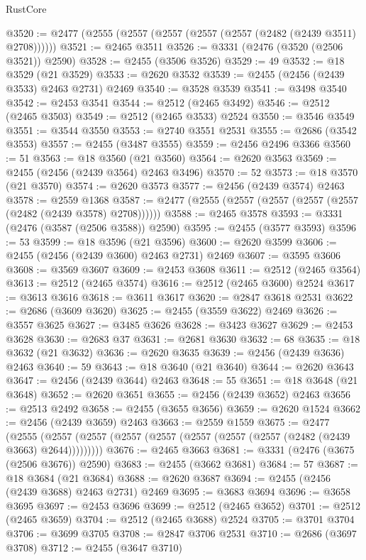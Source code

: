 \begin{lexlean}{RustCore}
\begin{coremodule}
@3520 := @2477 (@2555 (@2557 (@2557 (@2557 (@2557 (@2482 (@2439 @3511) @2708))))))
@3521 := @2465 @3511
@3526 := @3331 (@2476 (@3520 (@2506 @3521)) @2590)
@3528 := @2455 (@3506 @3526)
@3529 := 49
@3532 := @18 @3529 (@21 @3529)
@3533 := @2620 @3532
@3539 := @2455 (@2456 (@2439 @3533) @2463 @2731) @2469
@3540 := @3528 @3539
@3541 := @3498 @3540
@3542 := @2453 @3541
@3544 := @2512 (@2465 @3492)
@3546 := @2512 (@2465 @3503)
@3549 := @2512 (@2465 @3533) @2524
@3550 := @3546 @3549
@3551 := @3544 @3550
@3553 := @2740 @3551 @2531
@3555 := @2686 (@3542 @3553)
@3557 := @2455 (@3487 @3555)
@3559 := @2456 @2496 @3366
@3560 := 51
@3563 := @18 @3560 (@21 @3560)
@3564 := @2620 @3563
@3569 := @2455 (@2456 (@2439 @3564) @2463 @3496)
@3570 := 52
@3573 := @18 @3570 (@21 @3570)
@3574 := @2620 @3573
@3577 := @2456 (@2439 @3574) @2463
@3578 := @2559 @1368
@3587 := @2477 (@2555 (@2557 (@2557 (@2557 (@2557 (@2482 (@2439 @3578) @2708))))))
@3588 := @2465 @3578
@3593 := @3331 (@2476 (@3587 (@2506 @3588)) @2590)
@3595 := @2455 (@3577 @3593)
@3596 := 53
@3599 := @18 @3596 (@21 @3596)
@3600 := @2620 @3599
@3606 := @2455 (@2456 (@2439 @3600) @2463 @2731) @2469
@3607 := @3595 @3606
@3608 := @3569 @3607
@3609 := @2453 @3608
@3611 := @2512 (@2465 @3564)
@3613 := @2512 (@2465 @3574)
@3616 := @2512 (@2465 @3600) @2524
@3617 := @3613 @3616
@3618 := @3611 @3617
@3620 := @2847 @3618 @2531
@3622 := @2686 (@3609 @3620)
@3625 := @2455 (@3559 @3622) @2469
@3626 := @3557 @3625
@3627 := @3485 @3626
@3628 := @3423 @3627
@3629 := @2453 @3628
@3630 := @2683 @37
@3631 := @2681 @3630
@3632 := 68
@3635 := @18 @3632 (@21 @3632)
@3636 := @2620 @3635
@3639 := @2456 (@2439 @3636) @2463
@3640 := 59
@3643 := @18 @3640 (@21 @3640)
@3644 := @2620 @3643
@3647 := @2456 (@2439 @3644) @2463
@3648 := 55
@3651 := @18 @3648 (@21 @3648)
@3652 := @2620 @3651
@3655 := @2456 (@2439 @3652) @2463
@3656 := @2513 @2492
@3658 := @2455 (@3655 @3656)
@3659 := @2620 @1524
@3662 := @2456 (@2439 @3659) @2463
@3663 := @2559 @1559
@3675 := @2477
    (@2555 (@2557 (@2557 (@2557 (@2557 (@2557 (@2557 (@2557 (@2482 (@2439 @3663) @2644)))))))))
@3676 := @2465 @3663
@3681 := @3331 (@2476 (@3675 (@2506 @3676)) @2590)
@3683 := @2455 (@3662 @3681)
@3684 := 57
@3687 := @18 @3684 (@21 @3684)
@3688 := @2620 @3687
@3694 := @2455 (@2456 (@2439 @3688) @2463 @2731) @2469
@3695 := @3683 @3694
@3696 := @3658 @3695
@3697 := @2453 @3696
@3699 := @2512 (@2465 @3652)
@3701 := @2512 (@2465 @3659)
@3704 := @2512 (@2465 @3688) @2524
@3705 := @3701 @3704
@3706 := @3699 @3705
@3708 := @2847 @3706 @2531
@3710 := @2686 (@3697 @3708)
@3712 := @2455 (@3647 @3710)

\end{coremodule}
\end{lexlean}
